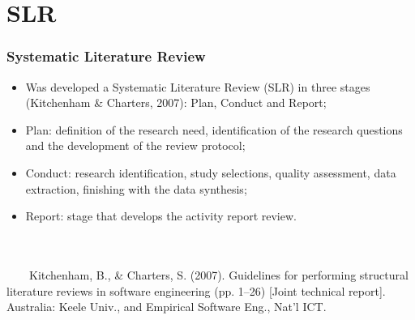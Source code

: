 \documentclass[10pt]{beamer}
\begin{document}
\section{SLR}

\begin{frame}
	\frametitle{Systematic Literature Review}
	\begin{itemize}
		\item Was developed a Systematic Literature Review (SLR) in three stages \footnotesize(Kitchenham \& Charters, 2007)\normalsize: Plan, Conduct and Report;
		\item Plan: definition of the research need, identification of the research questions and the development of the review protocol;
		\item Conduct: research identification, study selections, quality assessment, data extraction, finishing with the data synthesis;
		\item Report: stage that develops the activity report review.\\~\\~\\
	\end{itemize}
	\tiny
	~~~~Kitchenham, B., \& Charters, S. (2007). Guidelines for performing structural literature reviews in software engineering (pp. 1–26) [Joint technical report]. Australia: Keele Univ., and Empirical Software Eng., Nat’l ICT.\\
\end{frame}

\end{document}
